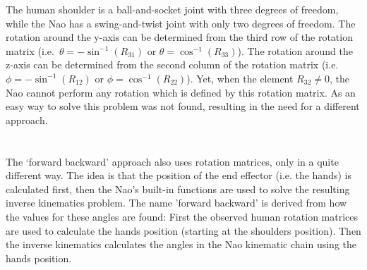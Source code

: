 \documentclass[letterpaper, 10pt, conference]{ieeeconf}
\begin{document}

The human shoulder is a ball-and-socket joint with three degrees of freedom\cite{Woodson1992}, while the Nao has a swing-and-twist joint with only two degrees of freedom. 
The rotation around the y-axis can be determined from the third row of the rotation matrix (i.e.\ $\theta = - \sin^{-1}(R_{31})$ or $\theta =  \cos^{-1}(R_{33})$).
The rotation around the z-axis can be determined from the second column of the rotation matrix (i.e.\ $\phi = - \sin^{-1}(R_{12})$ or $\phi =  \cos^{-1}(R_{22})$).
Yet, when the element $R_{32} \neq 0$, the Nao cannot perform any rotation which is defined by this rotation matrix.
As an easy way to solve this problem was not found, resulting in the need for a different approach. \\\\
\\
The ‘forward backward’ approach also uses rotation matrices, only in a quite different way. 
The idea is that the position of the end effector (i.e. the hands) is calculated first, then the Nao's built-in functions are used to solve the resulting inverse kinematics problem. 
The name 'forward backward' is derived from how the values for these angles are found: First the observed human rotation matrices are used to calculate the hands position (starting at the shoulders position). Then the inverse kinematics calculates the angles in the Nao kinematic chain using the hands position. 
\end{document}
